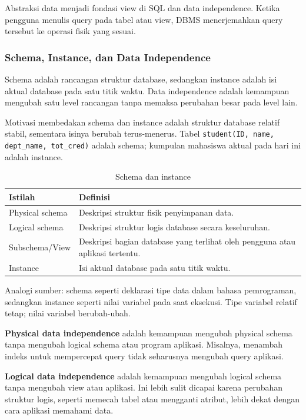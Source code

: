 Abstraksi data menjadi fondasi view di SQL dan data independence. Ketika pengguna menulis query pada tabel atau view, DBMS menerjemahkan query tersebut ke operasi fisik yang sesuai.

\subsubsection{Schema, Instance, dan Data Independence}

\begin{jawab}
Schema adalah rancangan struktur database, sedangkan instance adalah isi aktual database pada satu titik waktu. Data independence adalah kemampuan mengubah satu level rancangan tanpa memaksa perubahan besar pada level lain.
\end{jawab}

Motivasi membedakan schema dan instance adalah struktur database relatif stabil, sementara isinya berubah terus-menerus. Tabel \texttt{student(ID, name, dept\_name, tot\_cred)} adalah schema; kumpulan mahasiswa aktual pada hari ini adalah instance.

\begin{table}[H]
\centering
\begin{tabularx}{\textwidth}{|L{0.25\textwidth}|X|}
\hline
\textbf{Istilah} & \textbf{Definisi} \\
\hline
Physical schema & Deskripsi struktur fisik penyimpanan data. \\
\hline
Logical schema & Deskripsi struktur logis database secara keseluruhan. \\
\hline
Subschema/View & Deskripsi bagian database yang terlihat oleh pengguna atau aplikasi tertentu. \\
\hline
Instance & Isi aktual database pada satu titik waktu. \\
\hline
\end{tabularx}
\caption{Schema dan instance}
\label{tab:schema-instance}
\end{table}

Analogi sumber: schema seperti deklarasi tipe data dalam bahasa pemrograman, sedangkan instance seperti nilai variabel pada saat eksekusi. Tipe variabel relatif tetap; nilai variabel berubah-ubah.

\textbf{Physical data independence} adalah kemampuan mengubah physical schema tanpa mengubah logical schema atau program aplikasi. Misalnya, menambah indeks untuk mempercepat query tidak seharusnya mengubah query aplikasi.

\textbf{Logical data independence} adalah kemampuan mengubah logical schema tanpa mengubah view atau aplikasi. Ini lebih sulit dicapai karena perubahan struktur logis, seperti memecah tabel atau mengganti atribut, lebih dekat dengan cara aplikasi memahami data.

